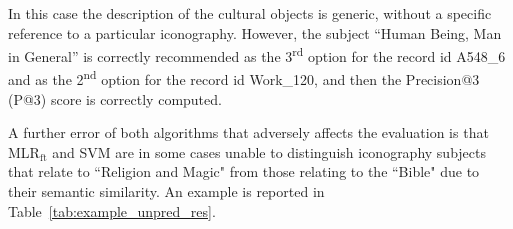 \documentclass[epsfig,a4paper,12pt,titlepage]{book}
\newcommand{\mlr}{MLR$_\text{ft}$\xspace}
\begin{document}
\begin{table}[h]
\caption{Sample of wrong prediction outcome}
  
\label{tab:example_pred_res}       %
\setlength{\tabcolsep}{2pt}
\centering
{}
\end{table}

In this case the description of the cultural objects is generic, without a specific reference to a particular iconography. 
However, the subject ``Human Being, Man in General'' is correctly recommended as the 3\textsuperscript{rd} option for the record id A548\_6 and as the 2\textsuperscript{nd} option for the record id Work\_120, and then the Precision@3 (P@3) score is correctly computed.

A further error of both algorithms that adversely affects the evaluation is that \mlr and SVM are in some cases unable to distinguish iconography subjects that relate to ``Religion and Magic" from those relating to the ``Bible" due to their  semantic similarity. An example is reported in Table~\ref{tab:example_unpred_res}.
\end{document}
